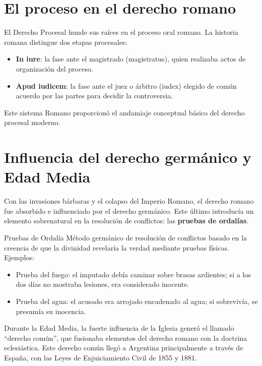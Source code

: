\documentclass[12pt,oneside]{book}
\begin{document}
\section{El proceso en el derecho romano}

El Derecho Procesal hunde sus raíces en el proceso oral romano. La historia romana distingue dos etapas procesales:

\begin{itemize}
    \item \textbf{In iure}: la fase ante el magistrado (magistratus), quien realizaba actos de organización del proceso.
    \item \textbf{Apud iudicem}: la fase ante el juez o árbitro (iudex) elegido de común acuerdo por las partes para decidir la controversia.
\end{itemize}

Este sistema Romano proporcionó el andamiaje conceptual básico del derecho procesal moderno.

\section{Influencia del derecho germánico y Edad Media}

Con las invasiones bárbaras y el colapso del Imperio Romano, el derecho romano fue absorbido e influenciado por el derecho germánico. Este último introducía un elemento sobrenatural en la resolución de conflictos: las \textbf{pruebas de ordalías}.

\begin{definition}{Pruebas de Ordalía}
Método germánico de resolución de conflictos basado en la creencia de que la divinidad revelaría la verdad mediante pruebas físicas. Ejemplos:
\begin{itemize}
    \item Prueba del fuego: el imputado debía caminar sobre brasas ardientes; si a los dos días no mostraba lesiones, era considerado inocente.
    \item Prueba del agua: el acusado era arrojado encadenado al agua; si sobrevivía, se presumía su inocencia.
\end{itemize}
\end{definition}

Durante la Edad Media, la fuerte influencia de la Iglesia generó el llamado ``derecho común'', que fusionaba elementos del derecho romano con la doctrina eclesiástica. Este derecho común llegó a Argentina principalmente a través de España, con las Leyes de Enjuiciamiento Civil de 1855 y 1881.
\end{document}
